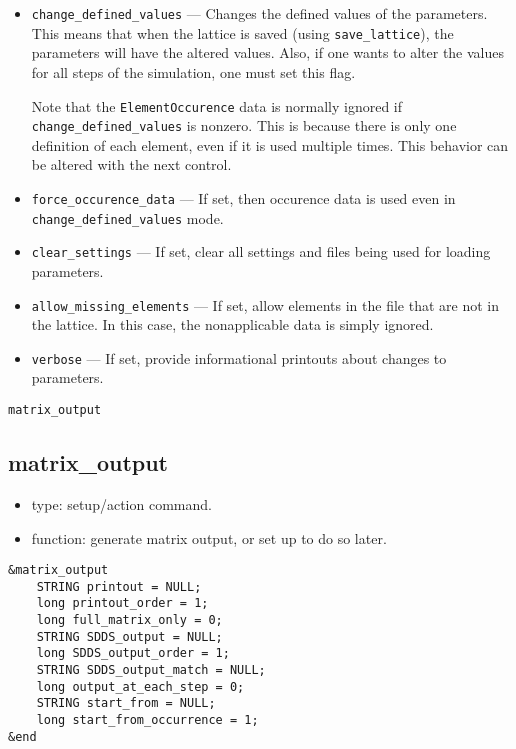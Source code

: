 \documentclass[11pt]{article}
\begin{document}
\begin{itemize}
\item \verb|change_defined_values| --- Changes the defined values of
the parameters.  This means that when the lattice is saved (using
\verb|save_lattice|), the parameters will have the altered values.
Also, if one wants to alter the values for all steps of the simulation,
one must set this flag. 

Note that the \verb|ElementOccurence| data is normally ignored if
\verb|change_defined_values| is nonzero.  This is because there is
only one definition of each element, even if it is used multiple times.
This behavior can be altered with the next control.

\item \verb|force_occurence_data| --- If set, then occurence data is
used even in \verb|change_defined_values| mode.

\item \verb|clear_settings| --- If set, clear all settings and files
being used for loading parameters.

\item \verb|allow_missing_elements| --- If set, allow elements in the
file that are not in the lattice.  In this case, the nonapplicable
data is simply ignored.

\item \verb|verbose| --- If set, provide informational printouts about
changes to parameters.

\end{itemize}


\begin{latexonly}
\newpage
\begin{center}{\Large\verb|matrix_output|}\end{center}
\end{latexonly}
\subsection{matrix\_output}

\begin{itemize}
\item type: setup/action command.
\item function: generate matrix output, or set up to do so later.
\end{itemize}

\begin{verbatim}
&matrix_output
    STRING printout = NULL;
    long printout_order = 1;
    long full_matrix_only = 0;
    STRING SDDS_output = NULL;
    long SDDS_output_order = 1;
    STRING SDDS_output_match = NULL;
    long output_at_each_step = 0;
    STRING start_from = NULL;
    long start_from_occurrence = 1;
&end
\end{verbatim}
\end{document}
